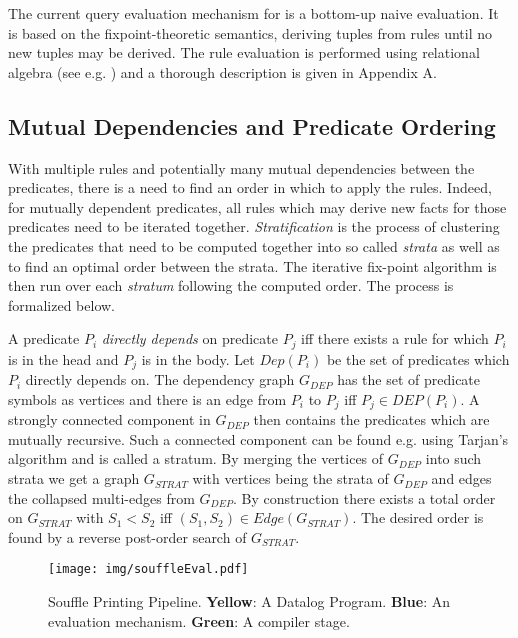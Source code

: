 \newcommand{\sigmatwo}{\overline{\sigma}}
The current query evaluation mechanism for \datalogM is a bottom-up naive\cite{Green:2013:DRQ:2688167.2688168} evaluation. It is based on the fixpoint-theoretic semantics, deriving tuples from rules until no new tuples may be derived. The rule evaluation is performed using relational algebra (see e.g. \cite{Abiteboul:1995:FDL:551350}) and a thorough description is given in Appendix A.

\subsection{Mutual Dependencies and Predicate Ordering}
With multiple rules and potentially many mutual dependencies between the predicates, there is a need to find an order in which to apply the rules. Indeed, for mutually dependent predicates, all rules which may derive new facts for those predicates need to be iterated together. \textit{Stratification}\cite{Green:2013:DRQ:2688167.2688168} is the process of clustering the predicates that need to be computed together into so called \textit{strata} as well as to find an optimal order between the strata. The iterative fix-point algorithm is then run over each \textit{stratum} following the computed order. The process is formalized below.

A predicate $P_i$ \textit{directly depends} on predicate $P_j$ iff there exists a rule for which $P_i$ is in the head and $P_j$ is in the body. Let $Dep(P_i)$ be the set of predicates which $P_i$ directly depends on. The dependency graph $G_{DEP}$ has the set of predicate symbols as vertices and there is an edge from $P_i$ to $P_j$ iff $P_j \in DEP(P_i)$. A strongly connected component in $G_{DEP}$ then contains the predicates which are mutually recursive. Such a connected component can be found e.g. using Tarjan's algorithm \cite{Tarjan72depthfirst} and is called a stratum. By merging the vertices of $G_{DEP}$ into such strata we get a graph $G_{STRAT}$ with vertices being the strata of $G_{DEP}$ and edges the collapsed multi-edges from $G_{DEP}$. By construction there exists a total order on $G_{STRAT}$ with $S_1 < S_2$ iff $(S_1, S_2) \in Edge(G_{STRAT})$. The desired order is found by a reverse post-order search of $G_{STRAT}$.
\begin{figure*}[!hbt]
	\texttt{[image: img/souffleEval.pdf]}
	\caption{Souffle Printing Pipeline. \textbf{Yellow}: A Datalog Program. \textbf{Blue}: An evaluation mechanism. \textbf{Green}: A compiler stage. }
	\label{figure:soufflePipeline}
\end{figure*}

